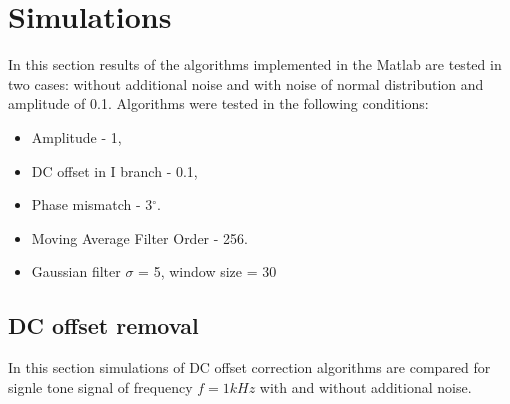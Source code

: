\documentclass[en,printmode]{mgr}
\begin{document}
	\section{Simulations}
		In this section results of the algorithms implemented in the Matlab are
		tested in two cases: without additional noise and with noise of normal distribution and 
		amplitude of 0.1.
		Algorithms were tested in the following conditions:
		\begin{itemize}
			\item Amplitude - 1,
			\item DC offset in I branch - 0.1,
			\item Phase mismatch - 3$^\circ$.
			\item Moving Average Filter Order - 256.
			\item Gaussian filter $\sigma$ = 5, window size = 30
		\end{itemize}
		\subsection*{DC offset removal}
		In this section simulations of DC offset correction algorithms are compared for signle tone
		signal of frequency $f=1kHz$ with and without additional noise.
\end{document}
